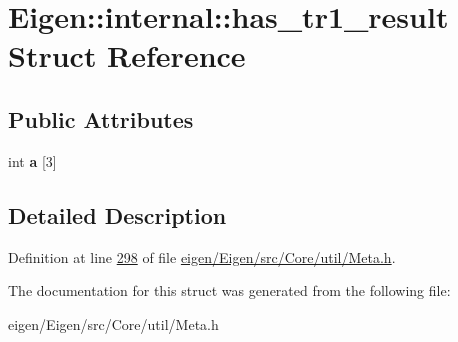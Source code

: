 \hypertarget{struct_eigen_1_1internal_1_1has__tr1__result}{}\section{Eigen\+:\+:internal\+:\+:has\+\_\+tr1\+\_\+result Struct Reference}
\label{struct_eigen_1_1internal_1_1has__tr1__result}
\subsection*{Public Attributes}
\begin{DoxyCompactItemize}
\item 
\mbox{\label{struct_eigen_1_1internal_1_1has__tr1__result_a89d38ca3c93aec2aae4be718ceb3b3ed}} 
int {\bfseries a} \mbox{[}3\mbox{]}
\end{DoxyCompactItemize}


\subsection{Detailed Description}


Definition at line \hyperlink{eigen_2_eigen_2src_2_core_2util_2_meta_8h_source_l00298}{298} of file \hyperlink{eigen_2_eigen_2src_2_core_2util_2_meta_8h_source}{eigen/\+Eigen/src/\+Core/util/\+Meta.\+h}.



The documentation for this struct was generated from the following file\+:\begin{DoxyCompactItemize}
\item 
eigen/\+Eigen/src/\+Core/util/\+Meta.\+h\end{DoxyCompactItemize}
